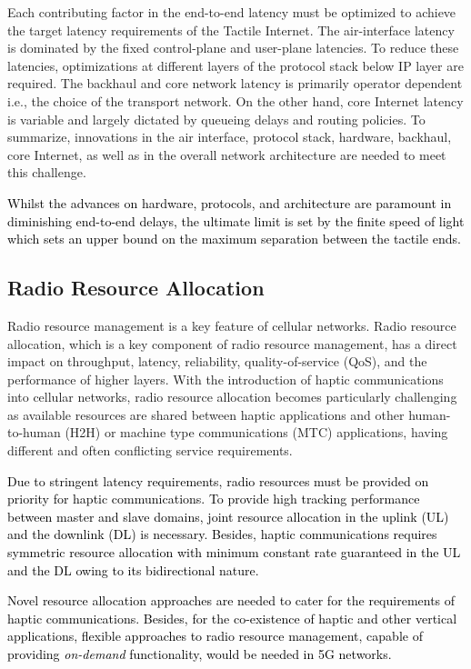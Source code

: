 \documentclass[journal]{IEEEtran}
\begin{document}
Each contributing factor in the end-to-end latency must be optimized to achieve the target latency requirements of the Tactile Internet. The air-interface latency is dominated by the fixed control-plane and user-plane latencies. To reduce these latencies, optimizations at different layers of the protocol stack below IP layer are required. The backhaul and core network latency is primarily operator dependent i.e., the choice of the transport network. On the other hand, core Internet latency is variable and largely dictated by queueing delays and routing policies. To summarize, innovations in the air interface, protocol stack, hardware, backhaul, core Internet, as well as in the overall network architecture are needed to meet this challenge.

\textcolor{black}{Whilst the advances on hardware, protocols, and architecture are paramount in diminishing end-to-end delays, the ultimate limit is set by the finite speed of light which sets an upper bound on the maximum separation between the tactile ends.
}






\subsection{Radio Resource Allocation}

Radio resource management is a key feature of cellular networks. Radio resource allocation, which is a key component of radio resource management, has a direct impact on throughput, latency, reliability, quality-of-service (QoS), and the performance of higher layers.  With the introduction of haptic communications into cellular networks, radio resource allocation becomes particularly challenging as available resources are shared between haptic applications and other human-to-human (H2H) or machine type communications (MTC) applications, having different and often conflicting service requirements.

\textcolor{black} {Due to stringent latency requirements, radio resources must be provided on priority for haptic communications. To provide high tracking performance between master and slave domains, joint resource allocation in the uplink (UL) and the downlink (DL) is necessary. Besides, haptic communications requires symmetric resource allocation with minimum constant rate guaranteed in the UL and the DL owing to its bidirectional nature.}

\textcolor{black}{Novel resource allocation approaches are needed to cater for the requirements of haptic communications. Besides, for the co-existence of haptic and other vertical applications, flexible approaches to radio resource management, capable of providing \emph{on-demand} functionality, would be needed in 5G networks. }
\end{document}
